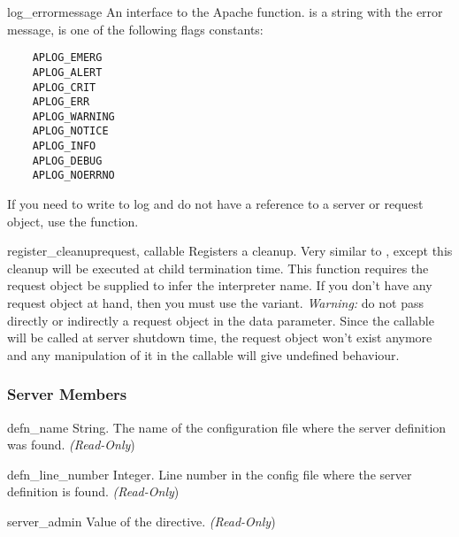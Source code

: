 \begin{methoddesc}[server]{log_error}{message}
  An interface to the Apache 
  function.  is a string with the error message,
   is one of the following flags constants:

  \begin{verbatim}
    APLOG_EMERG
    APLOG_ALERT
    APLOG_CRIT
    APLOG_ERR
    APLOG_WARNING
    APLOG_NOTICE
    APLOG_INFO
    APLOG_DEBUG
    APLOG_NOERRNO
  \end{verbatim}            

  If you need to write to log and do not have a reference to a server or
  request object, use the  function.
\end{methoddesc}

\begin{methoddesc}[server]{register_cleanup}{request, callable}
  Registers a cleanup. Very similar to , except
  this cleanup will be executed at child termination time. This function
  requires the request object be supplied to infer the interpreter name.
  If you don't have any request object at hand, then you must use the
   variant.
  \emph{Warning:} do not pass directly or indirectly a request object in the
  data parameter. Since the callable will be called at server shutdown time,
  the request object won't exist anymore and any manipulation of it in the
  callable will give undefined behaviour.
\end{methoddesc}

\subsubsection{Server Members\label{pyapi-mpsrv-mem}}

\begin{memberdesc}[server]{defn_name}
  String. The name of the configuration file where the server definition
  was found.
  \emph{(Read-Only})
\end{memberdesc}

\begin{memberdesc}[server]{defn_line_number}
  Integer. Line number in the config file where the server definition is
  found.
  \emph{(Read-Only})
\end{memberdesc}

\begin{memberdesc}[server]{server_admin}
  Value of the  directive. 
  \emph{(Read-Only})
\end{memberdesc}

